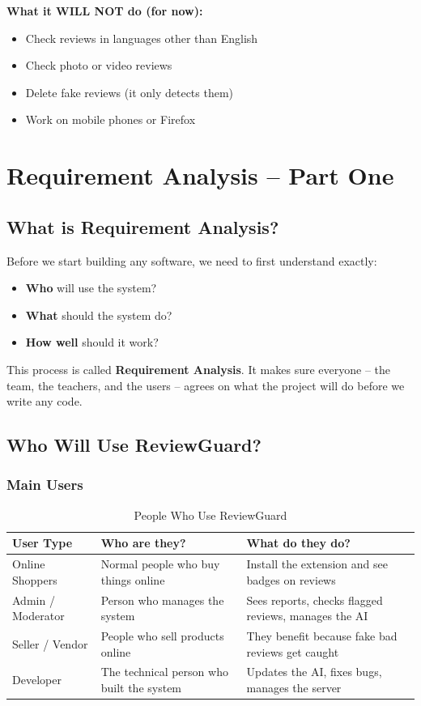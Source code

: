 \documentclass[10pt, a4paper]{report}
\begin{document}
\textbf{What it WILL NOT do (for now):}
\begin{itemize}
  \item Check reviews in languages other than English
  \item Check photo or video reviews
  \item Delete fake reviews (it only detects them)
  \item Work on mobile phones or Firefox
\end{itemize}

\chapter{Requirement Analysis -- Part One}

\section{What is Requirement Analysis?}

Before we start building any software, we need to first understand exactly:
\begin{itemize}
  \item \textbf{Who} will use the system?
  \item \textbf{What} should the system do?
  \item \textbf{How well} should it work?
\end{itemize}

This process is called \textbf{Requirement Analysis}. It makes sure everyone -- the team, the teachers, and the users -- agrees on what the project will do before we write any code.

\section{Who Will Use ReviewGuard?}

\subsection{Main Users}

\begin{table}[H]
\centering
\caption{People Who Use ReviewGuard}
\begin{tabularx}{\textwidth}{lXX}
\toprule
\textbf{User Type} & \textbf{Who are they?} & \textbf{What do they do?} \\
\midrule
Online Shoppers & Normal people who buy things online & Install the extension and see badges on reviews \\
Admin / Moderator & Person who manages the system & Sees reports, checks flagged reviews, manages the AI \\
Seller / Vendor & People who sell products online & They benefit because fake bad reviews get caught \\
Developer & The technical person who built the system & Updates the AI, fixes bugs, manages the server \\
\bottomrule
\end{tabularx}
\end{table}
\end{document}
